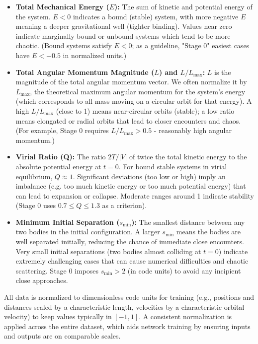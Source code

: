 \begin{itemize}
    \item \textbf{Total Mechanical Energy ($E$):} The sum of kinetic and potential energy of the system.  $E<0$ indicates a bound (stable) system, 
    with more negative $E$ meaning a deeper gravitational well (tighter binding).  Values near zero indicate marginally bound or unbound 
    systems which tend to be more chaotic.  (Bound systems satisfy $E<0$; as a guideline, "Stage 0" easiest cases have $E<-0.5$ in normalized units.)


    \item \textbf{Total Angular Momentum Magnitude ($L$) and $L/L_{\max}$:} $L$ is the magnitude of the total angular momentum vector. 
    We often normalize it by $L_{\max}$, the theoretical maximum angular momentum for the system's energy (which corresponds to 
    all mass moving on a circular orbit for that energy). A high $L/L_{\max}$ (close to 1) means near-circular orbits (stable); 
    a low ratio means elongated or radial orbits that lead to closer encounters and chaos. (For example, Stage 0 requires $L/L_{\max}>0.5$ - 
    reasonably high angular momentum.)



    \item \textbf{Virial Ratio (Q):} The ratio $2T/|V|$ of twice the total kinetic energy to the absolute potential energy at $t=0$.  
    For bound stable systems in virial equilibrium, $Q \approx 1$. Significant deviations (too low or high) imply an imbalance (e.g. 
    too much kinetic energy or too much potential energy) that can lead to expansion or collapse.  Moderate ranges around 1 indicate 
    stability (Stage 0 uses $0.7 \le Q \le 1.3$ as a criterion). 



    \item \textbf{Minimum Initial Separation ($s_{\min}$):} The smallest distance between any two bodies in the initial configuration. 
    A larger $s_{\min}$ means the bodies are well separated initially, reducing the chance of immediate close encounters.  
    Very small initial separations (two bodies almost colliding at $t=0$) indicate extremely challenging cases that can cause 
    numerical difficulties and chaotic scattering.  Stage 0 imposes $s_{\min}>2$ (in code units) to avoid any incipient close approaches. 
\end{itemize}

All data is normalized to dimensionless code units for training (e.g., positions and distances scaled by a characteristic length, velocities by a characteristic orbital velocity) to keep values typically in $[-1,1]$.  A consistent normalization is applied across the entire dataset, which aids network training by ensuring inputs and outputs are on comparable scales. 










